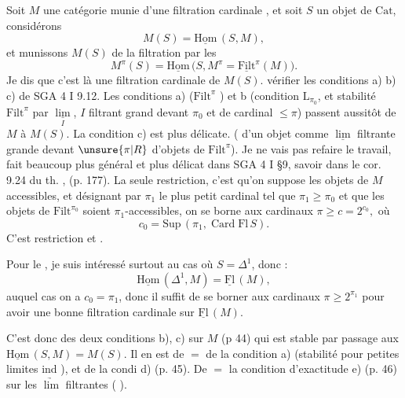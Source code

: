 Soit $M$ une catégorie munie d'une filtration cardinale , et  soit $S$ un objet de $\mathrm{Cat}$, considérons
\[
 M(S)=\underline{\mathrm{Hom}}\,(S,M),
\]
et munissons $M(S)$ de la filtration par les
\[
 M^\pi(S)=\underline{\mathrm{Hom}}\,\bigl(S,M^\pi=\underline{\mathrm{Filt}}^\pi(M)\bigr).
\]
Je dis que c'est là une filtration cardinale de $M(S)$.   vérifier les conditions a) b) c) de SGA 4 I 9.12. Les conditions a) ($\mathrm{Filt}^\pi$ ) et b (condition $\mathrm{L}_{\pi_0}$, et stabilité  $\mathrm{Filt}^\pi$ par $\underset I{\underline{\lim}}$,  $I$ filtrant grand devant $\pi_0$ et de cardinal $\leq\pi$) passent aussitôt de $M$ à $M(S)$. La condition c) est plus délicate. (
d'un objet comme $\underline{\lim}$ filtrante grande devant $\unsure{\pi|R}$ d'objets de $\mathrm{Filt}^\pi$). Je ne vais pas refaire le travail, fait   beaucoup plus général et plus délicat dans SGA 4 I §9, savoir dans le cor. 9.24 du th. , (p. 177). La seule restriction, c'est qu'on  suppose les objets de $M$ accessibles, et désignant par $\pi_1$  le plus petit cardinal tel que $\pi_1\geq\pi_0$ et que les objets de $\mathrm{Filt}^{\pi_0}$ soient $\pi_1$-accessibles, on se borne  aux cardinaux $\boxed{\pi\geq c=2^{c_0},}$ où
\[
 c_0=\mathrm{Sup}\,(\pi_1,\operatorname{Card}\mathrm{Fl}\, S).
\]
C'est  restriction  et .

Pour le , je suis intéressé surtout au cas où $S=\Delta^1$, donc :
\[
 \underline{\mathrm{Hom}}\,(\Delta^1,M)=\underline{\mathrm{Fl}}\,(M),
\]
auquel cas on a $c_0=\pi_1$, donc il suffit de se borner aux cardinaux $\pi\geq 2^{\pi_1}$ pour avoir une bonne filtration cardinale sur $\underline{\mathrm{Fl}}\,(M)$.

C'est donc  des deux conditions b), c) sur $M$ (p 44) qui est stable par passage aux $\underline{\mathrm{Hom}}\,(S,M)=M(S)$. Il en est de $=$ de la condition a) (stabilité pour petites limites ind ), et  de la condi%
%
%
 d) (p. 45). De $=$ la condition d'exactitude e) (p. 46) sur les $\underrightarrow{\lim}$ filtrantes (    ).

